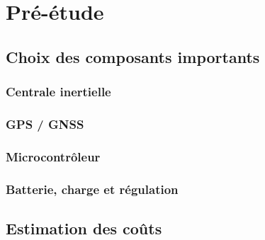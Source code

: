 \section{Pré-étude} \label{sec:Pre-Etude}

\subsection{Choix des composants importants} \label{ssec:Choix-composant}

\subsubsection{Centrale inertielle} \label{sssec:Choix-Centrale-inertielle}

\subsubsection{GPS / GNSS} \label{sssec:Choix-GPS}

\subsubsection{Microcontrôleur} \label{sssec:Choix-MCU}

\subsubsection{Batterie, charge et régulation} \label{sssec:Choix-Batterie-charge}

\subsection{Estimation des coûts} \label{sssec:Estimation-Couts}
